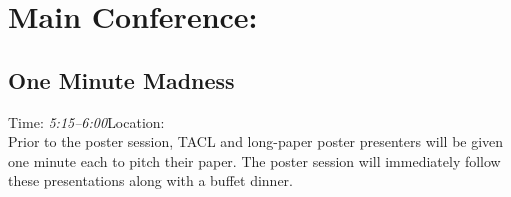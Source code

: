 \chapter{Main Conference: \daydate}
\thispagestyle{emptyheader}



\clearpage





%





\clearpage
\section{One Minute Madness}
{\large Time: \emph{5:15--6:00}\hfill Location: \OneLoc}\\

Prior to the poster session, TACL and long-paper poster presenters
will be given one minute each to pitch their paper. The poster session
will immediately follow these presentations along with a buffet
dinner.






